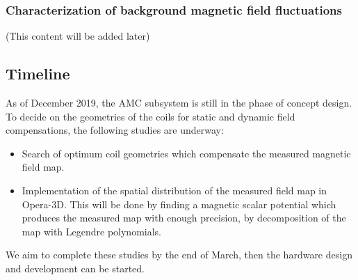 
\subsubsection*{Characterization of background magnetic field fluctuations}
(This content will be added later)



\subsection{Timeline}
As of December 2019, the AMC subsystem is still in the phase of concept design. To decide on the geometries of the coils for static and dynamic field compensations, the following studies are underway:
\begin{itemize}
\item Search of  optimum coil geometries which compensate the measured magnetic field map.
\item Implementation of the spatial distribution of the measured field map in Opera-3D. This will be done by finding a magnetic scalar potential which produces the measured map with enough precision, by decomposition of the map with Legendre polynomials. 
\end{itemize}
We aim to complete these studies by the end of March, then the hardware design and development can be started.




